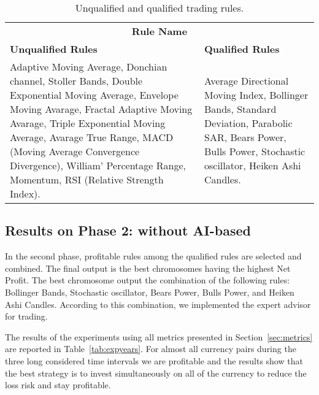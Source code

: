 \begin{table}[h!]
  \begin{center} 
    \caption{Unqualified and qualified trading rules.}
    \label{tab:qualrules}
    \begin{tabular}{p{6cm}  p{6cm} }
    \hline
    \multicolumn{2}{c}{\textbf{Rule Name}}
    \\\cline{1-2}
    \textbf{Unqualified Rules} & \textbf{Qualified Rules}\\
    \hline
    Adaptive Moving Average, Donchian channel, Stoller Bands,  Double Exponential Moving Average, Envelope Moving Avarage,  Fractal Adaptive Moving Avarage, Triple Exponential Moving Average, Avarage True Range,  MACD (Moving Average Convergence Divergence),  William' Percentage Range, Momentum, RSI (Relative Strength Index). 
    &
    Average Directional Moving Index, Bollinger Bands, Standard Deviation, Parabolic SAR, Bears Power, Bulls Power, Stochastic oscillator, Heiken Ashi Candles.\\
      \hline
    \end{tabular}
  \end{center}
\end{table}

\subsection{Results on Phase 2: without AI-based}
In the second phase, profitable rules among the qualified rules are selected and combined. The final output is the best chromosomes having the highest Net Profit.
The best chromosome output the combination of the following rules: Bollinger Bands, Stochastic oscillator, Bears Power, Bulls Power, and Heiken Ashi Candles. According to this combination, we implemented the expert advisor for trading. 

The results of the experiments using all metrics presented in Section~\ref{sec:metrics} are reported in Table~\ref{tab:expyears}. For almost all currency pairs during the three long considered time intervals we are profitable and the results show that the best strategy is to invest simultaneously on all of the currency to reduce the loss risk and stay profitable.

